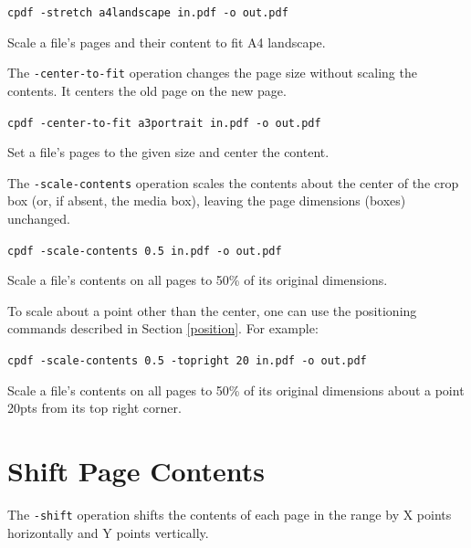 \documentclass{book}
\begin{document}
  \begin{framed}
  \small\noindent\verb!cpdf -stretch a4landscape in.pdf -o out.pdf!

  \vspace{2.5mm}
  \noindent Scale a file's pages and their content to fit A4 landscape.
  \end{framed}

\noindent The \texttt{-center-to-fit} operation changes the page size without scaling the contents. It centers the old page on the new page.

  \begin{framed}
  \small\noindent\verb!cpdf -center-to-fit a3portrait in.pdf -o out.pdf!

  \vspace{2.5mm}
  \noindent Set a file's pages to the given size and center the content.
  \end{framed}

\noindent The \texttt{-scale-contents} operation scales the contents about the center
  of the crop box (or, if absent, the media box), leaving the page dimensions
  (boxes) unchanged.

  \begin{framed}
  \small\noindent\verb!cpdf -scale-contents 0.5 in.pdf -o out.pdf!

  \vspace{2.5mm}
  \noindent Scale a file's contents on all pages to 50\% of its original dimensions.
  \end{framed}

  \noindent To scale about a point other than the center, one can use the positioning commands described in Section \ref{position}. For example:
  
  \begin{framed}
  \small\noindent\verb!cpdf -scale-contents 0.5 -topright 20 in.pdf -o out.pdf!

  \vspace{2.5mm}
  \noindent Scale a file's contents on all pages to 50\% of its original dimensions about a point 20pts from its top right corner.
  \end{framed}

  \section{Shift Page Contents}

  The \texttt{-shift} operation shifts the contents of each page in the range
by X points horizontally and Y points vertically.
\end{document}
